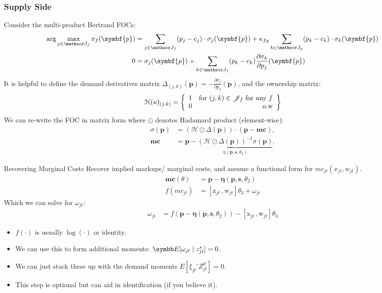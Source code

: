 \documentclass[aspectratio=169,10pt]{beamer}
\begin{document}
\begin{frame}[plain]
\frametitle{Supply Side}
Consider the multi-product Bertrand FOCs:
\footnotesize
{\begin{align*}
\arg \max_{p \in \calJ_f} \pi_f (\symbf{p}) &= \sum_{j \in \calJ_f} (p_j - c_j) \cdot \sigma_j(\symbf{p}) +  \kappa_{fg}\sum_{k \in \calJ_g} (p_k - c_k) \cdot \sigma_k(\symbf{p}) \\
0&= \sigma_j(\symbf{p}) + \sum_{k \in \calJ_f} (p_k - c_k) \frac{\partial \sigma_{k}}{\partial p_j}(\symbf{p}) 
\end{align*}
}
It is helpful to define the \alert{demand derivatives matrix} $\Delta_{(j,k)}(\symbf{p})  = - \frac{\partial \sigma_{j}}{\partial p_k}(\symbf{p})$, and the \alert{ownership matrix}:
\begin{align*}
\mathcal{H}(\kappa)_{(j,k)} = \left\{\begin{array}{lr}
          1 & \text{for }  (j,k) \in \mathscr{J}_f \text{ for any } f \\ 
      0 & \text{o.w}\\
        \end{array} \right\}
\end{align*}
We can re-write the FOC in matrix form where $\odot$ denotes Hadamard product (element-wise):
\begin{align*}
        \sigma(\symbf{p}) &= (\mathcal{H} \odot \Delta(\symbf{p})) \cdot (\symbf{p} - \symbf{mc}), \\
       \symbf{mc} &=  \symbf{p} - \underbrace{(\mathcal{H} \odot \Delta(\symbf{p}))^{-1} \sigma(\symbf{p})}_{\eta(\symbf{p},\symbf{s},\theta_2)}.
\end{align*}
\end{frame}



\begin{frame}{Recovering Marginal Costs }
Recover implied markups/ marginal costs, and assume a functional form for $mc_{jt}(x_{jt},w_{jt})$.
\begin{align*}
\symbf{mc}(\theta)&= \symbf{p}- \symbf{\eta}(\symbf{p},\symbf{s},\theta_2)\\
f(mc_{jt}) &= [\textrm{x}_{jt} \,, \textrm{w}_{jt}] \theta_3 + \omega_{jt}
\end{align*}
Which we can solve for $\omega_{jt}$:
\begin{align*}
\omega_{jt} &=  f(\symbf{p}- \symbf{\eta}(\symbf{p},\symbf{s},\theta_2) ) -[\textrm{x}_{jt} \,, \textrm{w}_{jt}] \theta_3 
\end{align*}
\begin{itemize}
\item $f(\cdot)$ is usually $\log(\cdot)$ or identity.
\item We can use this to form additional moments: $\E[\omega_{jt} \mid  z_{jt}^{s}]=0$.
\item We can just stack these up with the demand moments $E[\xi_{jt}' Z_{jt}^d]=0$.
\item This step is optional but can aid in identification (if you believe it).
\end{itemize}
\end{frame}
\end{document}
